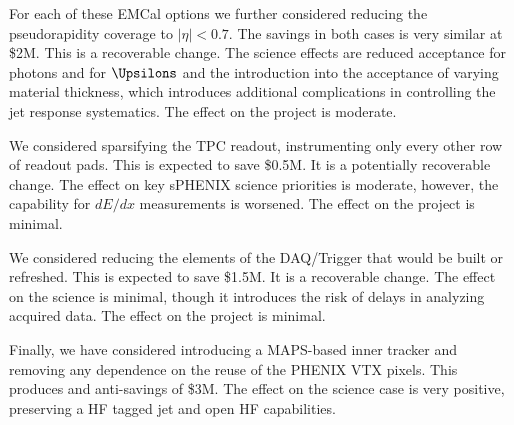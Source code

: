 For each of these EMCal options we further considered reducing the
pseudorapidity coverage to $|\eta| < 0.7$.  The savings in both cases
is very similar at \$2M.  This is a recoverable change.  The science
effects are reduced acceptance for photons and for $\Upsilons$ and the
introduction into the acceptance of varying material thickness, which
introduces additional complications in controlling the jet response
systematics. The effect on the project is moderate.

We considered sparsifying the TPC readout, instrumenting only every
other row of readout pads.  This is expected to save \$0.5M.  It is a
potentially recoverable change. The effect on key sPHENIX science
priorities is moderate, however, the capability for $dE/dx$
measurements is worsened.  The effect on the project is minimal. 

We considered reducing the elements of the DAQ/Trigger that would be
built or refreshed.  This is expected to save \$1.5M.  It is a
recoverable change.  The effect on the science is minimal, though it
introduces the risk of delays in analyzing acquired data. The effect
on the project is minimal. 

Finally, we have considered introducing a MAPS-based inner tracker and
removing any dependence on the reuse of the PHENIX VTX pixels.  This
produces and anti-savings of \$3M.  The effect on the science case is
very positive, preserving a HF tagged jet and open HF capabilities. 





